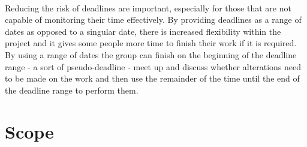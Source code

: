 \documentclass{article}
\begin{document}
\paragraph{}

Reducing the risk of deadlines are important, especially for those that are not
capable of monitoring their time effectively.  By providing deadlines as a range
of dates as opposed to a singular date, there is increased flexibility within
the project and it gives some people more time to finish their work if it is
required.  By using a range of dates the group can finish on the beginning of
the deadline range - a sort of pseudo-deadline - meet up and discuss whether
alterations need to be made on the work and then use the remainder of the time
until the end of the deadline range to perform them.

\section{Scope}
\paragraph{}


\printbibliography
\end{document}
